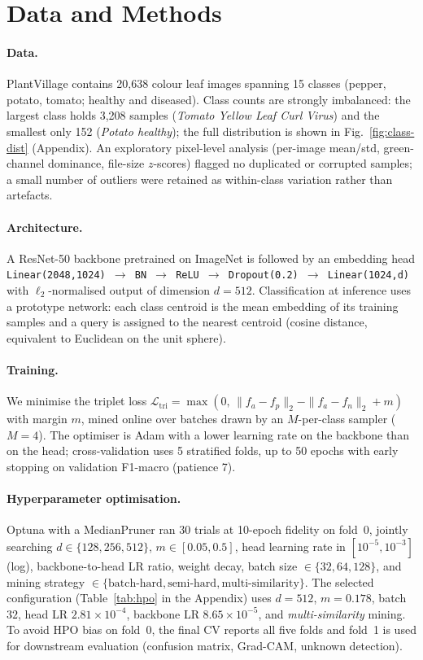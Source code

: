 \documentclass[pdflatex,sn-mathphys-num]{sn-jnl}
\begin{document}
\section{Data and Methods}\label{sec:methods}

\paragraph{Data.} PlantVillage \cite{mohanty2016using} contains 20{,}638 colour leaf images spanning 15 classes (pepper, potato, tomato; healthy and diseased). Class counts are strongly imbalanced: the largest class holds 3{,}208 samples (\textit{Tomato Yellow Leaf Curl Virus}) and the smallest only 152 (\textit{Potato healthy}); the full distribution is shown in Fig.~\ref{fig:class-dist} (Appendix). An exploratory pixel-level analysis (per-image mean/std, green-channel dominance, file-size $z$-scores) flagged no duplicated or corrupted samples; a small number of outliers were retained as within-class variation rather than artefacts.

\paragraph{Architecture.} A ResNet-50 backbone pretrained on ImageNet is followed by an embedding head \texttt{Linear(2048,1024) $\rightarrow$ BN $\rightarrow$ ReLU $\rightarrow$ Dropout(0.2) $\rightarrow$ Linear(1024,d)} with $\ell_2$-normalised output of dimension $d{=}512$. Classification at inference uses a prototype network: each class centroid is the mean embedding of its training samples and a query is assigned to the nearest centroid (cosine distance, equivalent to Euclidean on the unit sphere).

\paragraph{Training.} We minimise the triplet loss $\mathcal{L}_{\text{tri}}=\max(0,\,\|f_a-f_p\|_2-\|f_a-f_n\|_2+m)$ with margin $m$, mined online over batches drawn by an $M$-per-class sampler ($M{=}4$). The optimiser is Adam with a lower learning rate on the backbone than on the head; cross-validation uses 5 stratified folds, up to 50 epochs with early stopping on validation F1-macro (patience 7).

\paragraph{Hyperparameter optimisation.} Optuna with a MedianPruner ran 30 trials at 10-epoch fidelity on fold~0, jointly searching $d{\in}\{128,256,512\}$, $m{\in}[0.05,0.5]$, head learning rate in $[10^{-5},10^{-3}]$ (log), backbone-to-head LR ratio, weight decay, batch size $\in\{32,64,128\}$, and mining strategy $\in\{\text{batch-hard},\text{semi-hard},\text{multi-similarity}\}$. The selected configuration (Table~\ref{tab:hpo} in the Appendix) uses $d{=}512$, $m{=}0.178$, batch $32$, head LR $2.81{\times}10^{-4}$, backbone LR $8.65{\times}10^{-5}$, and \emph{multi-similarity} mining. To avoid HPO bias on fold~0, the final CV reports all five folds and fold~1 is used for downstream evaluation (confusion matrix, Grad-CAM, unknown detection).
\end{document}

